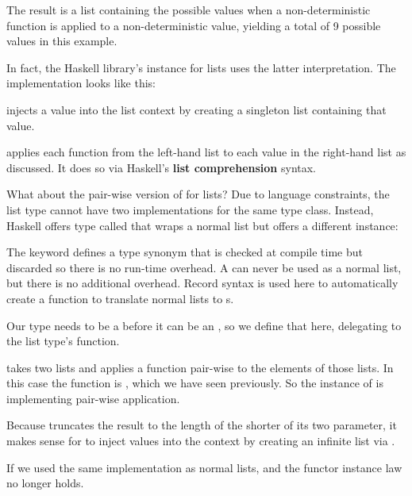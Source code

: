 The result is a list containing the possible values when a non-deterministic function is applied to a non-deterministic
value, yielding a total of 9 possible values in this example.

In fact, the Haskell library's  instance for lists uses the latter interpretation. The implementation looks like this:



\begin{notelist}
    \item {} injects a value into the list context by creating a singleton list containing that value.
    \item \code{(<*>)} applies each function from the left-hand list to each value in the right-hand list as discussed. It does
          so via Haskell's \textbf{list comprehension} syntax.
\end{notelist}

What about the pair-wise version of  for lists? Due to language constraints, the list type cannot have
two implementations for the same type class. Instead, Haskell offers type called  that wraps a normal
list but offers a different  instance:



\begin{notelist}
    \item The  keyword defines a type synonym that is checked at compile time but discarded so there is no
          run-time overhead. A  can never be used as a normal list, but there is no additional overhead.
          Record syntax is used here to automatically create a function  to translate normal lists to
          s.
    
    \item Our  type needs to be a  before it can be an , so we define that here,
          delegating to the list type's  function.

    \item {} takes two lists and applies a function pair-wise to the elements of those lists. In this case
          the function is \code{(\$)}, which we have seen previously. So the  instance of 
          is implementing pair-wise application.

    \item Because  truncates the result to the length of the shorter of its two parameter, it makes sense
          for  to inject values into the  context by creating an infinite list via .

    \item If we used the same  implementation as normal lists,  and the functor
          instance law no longer holds.
\end{notelist}

